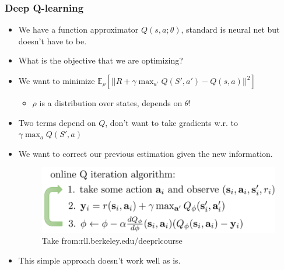 \documentclass{beamer}
\begin{document}
\begin{frame}\frametitle{Deep Q-learning}\small
\begin{itemize}
    \item We have a function approximator $Q(s,a;\theta)$, standard is neural net but doesn't have to be.
    \item What is the objective that we are optimizing?
    \item  We want to minimize $\mathbb{E}_{\rho}[||R+\gamma\max_{a'} Q(S',a')-Q(s,a)||^2]$
    \begin{itemize}
        \item $\rho$ is a distribution over states, depends on $\theta$!
    \end{itemize}
    \item Two terms depend on $Q$, don't want to take gradients w.r. to $\gamma\max_aQ(S',a)$
    \item We want to correct our previous estimation given the new information.
            \vspace{-0.2cm}
    \begin{figure}
        \includegraphics[width=0.85\linewidth]{Figures/Qalgo2}
        \vspace{-0.4cm}
        \caption{Take from:rll.berkeley.edu/deeprlcourse}
    \end{figure}
        \vspace{-0.5cm}
    \item This simple approach doesn't work well as is.
\end{itemize}
\end{frame}
\end{document}
